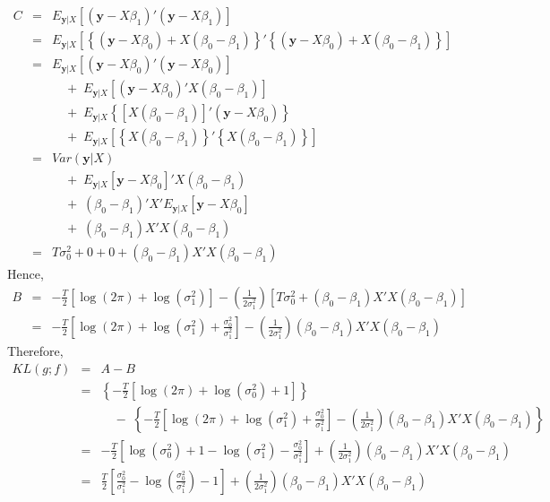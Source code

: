 \documentclass[12pt]{article}
\theoremstyle{definition}
\begin{document}
\begin{eqnarray*}
	C &=& E_{\mathbf{y}|X}\left[\left(\textbf{y} - X\beta_1\right)'\left(\textbf{y} -X\beta_1\right)\right]\\
		&=&E_{\mathbf{y}|X}\left[\left\{ \left(\mathbf{y} - X\beta_0\right) + X\left(\beta_0 - \beta_1\right)\right\}'\left\{ \left(\mathbf{y} - X\beta_0\right)+ X\left(\beta_0 - \beta_1\right)\right\} \right]\\ 
	&=& E_{\mathbf{y}|X}\left[\left(\mathbf{y} - X\beta_0\right)'\left(\mathbf{y} - X\beta_0\right)\right] \\
	&&\quad +\; E_{\mathbf{y}|X}\left[\left(\mathbf{y} -X\beta_0\right)'X\left(\beta_0 - \beta_1\right)\right] \\
	&& \quad +\;  E_{\mathbf{y}|X}\left\{\left[X\left(\beta_0 -\beta_1 \right) \right]'\left(\mathbf{y} - X\beta_0 \right)\right\} \\
	&& \quad + \;E_{\mathbf{y}|X}\left[\left\{X\left(\beta_0 - \beta_1\right)\right\}'\left\{X\left(\beta_0 - \beta_1\right)\right\} \right]\\ 
		&=& Var(\mathbf{y}|X)\\
		&&\quad +\; E_{\mathbf{y}|X}\left[\mathbf{y} - X\beta_0 \right]'X(\beta_0 -\beta_1) \\
		&& \quad + \;(\beta_0 -\beta_1)'X'E_{\mathbf{y}|X}\left[\mathbf{y} - X\beta_0 \right] \\
		&& \quad + \; (\beta_0 - \beta_1)X'X(\beta_0 - \beta_1)\\
	&=& T\sigma_0^2 + 0 + 0 + (\beta_0 - \beta_1)X'X(\beta_0 - \beta_1)
\end{eqnarray*}
Hence,
\begin{eqnarray*}
	B &=& -\frac{T}{2}\left[\log(2\pi) + \log(\sigma^2_1) \right] - \left(\frac{1}{2\sigma_1^2}\right) \left[ T\sigma_0^2 + (\beta_0 - \beta_1)X'X(\beta_0 - \beta_1)\right]\\
		&=& -\frac{T}{2}\left[\log(2\pi) + \log(\sigma^2_1) + \frac{\sigma_0^2}{\sigma_1^2}\right] - \left(\frac{1}{2\sigma_1^2} \right)(\beta_0 - \beta_1)X'X(\beta_0 - \beta_1)
\end{eqnarray*}
Therefore,
\begin{eqnarray*}
	KL(g;f) &=& A - B\\
		&=& \left\{ -\frac{T}{2}\left[ \log(2\pi) + \log(\sigma^2_0) +  1 \right]\right\}\\
		&& \quad - \; \left\{ -\frac{T}{2}\left[\log(2\pi) + \log(\sigma^2_1) + \frac{\sigma_0^2}{\sigma_1^2}\right] - \left(\frac{1}{2\sigma_1^2} \right)(\beta_0 - \beta_1)X'X(\beta_0 - \beta_1) \right\}\\
	&=& -\frac{T}{2} \left[ \log(\sigma_0^2) + 1 - \log(\sigma_1^2)  - \frac{\sigma_0^2}{\sigma_1^2}\right] + \left(\frac{1}{2\sigma_1^2} \right)(\beta_0 - \beta_1)X'X(\beta_0 - \beta_1)\\
	&=& \frac{T}{2}\left[\frac{\sigma_0^2}{\sigma_1^2}  - \log\left(\frac{\sigma_0^2}{\sigma_1^2} \right) - 1\right] + \left(\frac{1}{2\sigma_1^2} \right)(\beta_0 - \beta_1)X'X(\beta_0 - \beta_1)
\end{eqnarray*}
\end{document}
